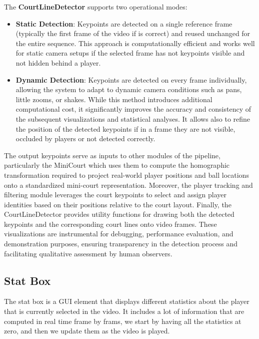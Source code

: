 The \textbf{CourtLineDetector} supports two operational modes:
\begin{itemize}
    \item \textbf{Static Detection}: Keypoints are detected on a single reference frame (typically the first frame of the video if is correct) and reused unchanged for the entire sequence. 
        This approach is computationally efficient and works well for static camera setups if the selected frame has not keypoints visible and not hidden behind a player.
    \item \textbf{Dynamic Detection}: Keypoints are detected on every frame individually, allowing the system to adapt to dynamic camera conditions such as pans, little zooms, or shakes. 
        While this method introduces additional computational cost, it significantly improves the accuracy and consistency of the subsequent visualizations and statistical analyses. 
        It allows also to refine the position of the detected keypoints if in a frame they are not visible, occluded by players or not detected correctly.
\end{itemize}

The output keypoints serve as inputs to other modules of the pipeline, particularly the MiniCourt which uses them to compute the homographic transformation required to project real-world player positions and ball locations onto a standardized mini-court representation. 
Moreover, the player tracking and filtering module leverages the court keypoints to select and assign player identities based on their positions relative to the court layout.
Finally, the CourtLineDetector provides utility functions for drawing both the detected keypoints and the corresponding court lines onto video frames. 
These visualizations are instrumental for debugging, performance evaluation, and demonstration purposes, ensuring transparency in the detection process and facilitating qualitative assessment by human observers.

\subsection{Stat Box}

The stat box is a GUI element that displays different statistics about the player that is currently selected in the video. 
It includes a lot of information that are computed in real time frame by frams, we start by having all the statistics at zero, and then we update them as the video is played.

